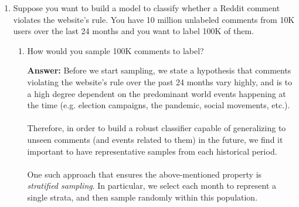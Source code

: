 \documentclass{article}
\newenvironment{QandA}{\begin{enumerate}[label=\arabic*.]}{\end{enumerate}}
\newenvironment{InnerQandA}{\begin{enumerate}[label=\roman*.]}{\end{enumerate}}
\newenvironment{ListAlph}{\begin{enumerate}[label=(\alph*)]}{\end{enumerate}}
\newenvironment{answer}{\par\normalfont \textbf{Answer:}}{}
\newcommand{\g}{\vert}
\begin{document}
\begin{QandA}
\begin{answer}
\begin{ListAlph}
            \item \textit{Negative Sampling.} 
            Negative sampling is a simplified variant of Noise Contrastive Estimation where we neglect to subtract off $\log(Q(y \g x))$ during training. As a result, $F(x, y)$ is trained to approximate $ \log(P(y \g x)) - \log(Q(y \g x))$.\\\\
            It is noteworthy that in Negative Sampling, we are optimizing $F(x, y)$ to approximate something that depends on the sampling distribution $Q$. This will make the results highly dependent on the choice of sampling distribution, which is not true for the previous algorithms. 
            
            (Source: \href{https://www.tensorflow.org/extras/candidate_sampling.pdf}{Tensorflow})
        \end{ListAlph}
    \end{answer}

    \item Suppose you want to build a model to classify whether a Reddit comment violates the website’s rule. You have 10 million unlabeled comments from 10K users over the last 24 months and you want to label 100K of them.
    \begin{InnerQandA}
        \item How would you sample 100K comments to label?
        \begin{answer}
            Before we start sampling, we state a hypothesis that comments violating the website's rule over the past 24 months vary highly, and is to a high degree dependent on the predominant world events happening at the time (e.g. election campaigns, the pandemic, social movements, etc.). \\\\
            Therefore, in order to build a robust classifier capable of generalizing to unseen comments (and events related to them) in the future, we find it important to have representative samples from each historical period. \\\\
            One such approach that ensures the above-mentioned property is \textit{stratified sampling}. In particular, we select each month to represent a single strata, and then sample randomly within this population.
        \end{answer}


\end{InnerQandA}
\end{QandA}
\end{document}
